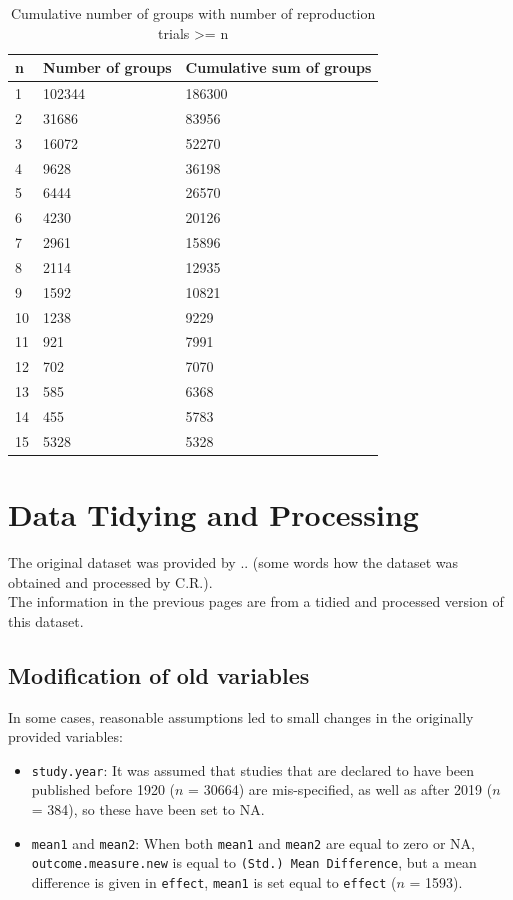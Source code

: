 \documentclass[11pt,a4paper,twoside]{book}\usepackage[]{graphicx}\usepackage[]{color}
\begin{document}
\begin{table}[ht]
\centering
\begingroup\footnotesize
\begin{tabular}{lll}
  \hline
n & Number of groups & Cumulative sum of groups \\ 
  \hline
1 & 102344 & 186300 \\ 
  2 & 31686 & 83956 \\ 
  3 & 16072 & 52270 \\ 
  4 & 9628 & 36198 \\ 
  5 & 6444 & 26570 \\ 
  6 & 4230 & 20126 \\ 
  7 & 2961 & 15896 \\ 
  8 & 2114 & 12935 \\ 
  9 & 1592 & 10821 \\ 
  10 & 1238 & 9229 \\ 
  11 & 921 & 7991 \\ 
  12 & 702 & 7070 \\ 
  13 & 585 & 6368 \\ 
  14 & 455 & 5783 \\ 
  15 & 5328 & 5328 \\ 
   \hline
\end{tabular}
\endgroup
\caption{Cumulative number of groups with number of reproduction trials >= n} 
\label{repr.groups}
\end{table}


\section{Data Tidying and Processing} \label{sec:Processing}
The original dataset was provided by .. (some words how the dataset was obtained and processed by C.R.). \\
The information in the previous pages are from a tidied and processed version of this dataset. \\

\subsection{Modification of old variables}
In some cases, reasonable assumptions led to small changes in the originally provided variables:
\begin{itemize}
\item \texttt{study.year}: It was assumed that studies that are declared to have been published before 1920 ($n$ = 30664) are mis-specified, as well as after 2019 ($n$ = 384), so these have been set to NA. 
\item \texttt{mean1} and \texttt{mean2}: When both \texttt{mean1} and \texttt{mean2} are equal to zero or NA, \texttt{outcome.measure.new} is equal to \texttt{(Std.) Mean Difference}, but a mean difference is given in \texttt{effect}, \texttt{mean1} is set equal to \texttt{effect} ($n$ = 1593).
\end{itemize}
\end{document}
